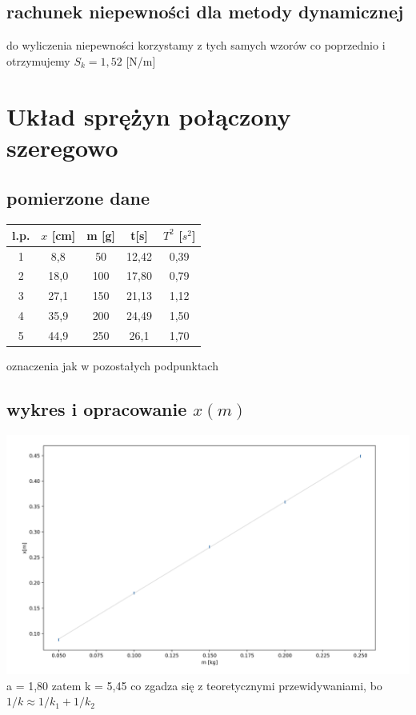 \documentclass{article}
\begin{document}
\subsection{rachunek niepewności dla metody dynamicznej}
do wyliczenia niepewności korzystamy z tych samych wzorów co poprzednio i otrzymujemy
$S_k = 1, 52$ [N/m]

\section{Układ sprężyn połączony szeregowo}
\subsection{pomierzone dane}
\begin{center}
\begin{tabular}{ c | c | c | c | c  }
l.p. & $x$ [cm] & m [g] & t[s]  & $T^2$ [$s^2$]\\
\hline
 1 & 8,8   & 50 & 12,42 & 0,39\\ 
 2 & 18,0   & 100 &17,80 & 0,79\\ 
 3 & 27,1   & 150 & 21,13 & 1,12\\ 
 4 & 35,9  & 200 & 24,49 & 1,50\\
 5 & 44,9 & 250 & 26,1 & 1,70\\


\end{tabular}
\end{center}
oznaczenia jak w pozostałych podpunktach

\subsection{wykres i opracowanie $x(m)$}
\includegraphics[width=15cm]{m7_5a}
a = 1,80 zatem k = 5,45 co zgadza się z teoretycznymi przewidywaniami, bo $1/k \approx 1/k_1 + 1/k_2$
\end{document}
